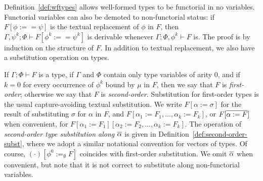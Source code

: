 \documentclass{lmcs}
\theoremstyle{plain}\newtheorem{satz}[thm]{Satz}
\begin{document}
Definition~\ref{def:wftypes} allows well-formed types to be functorial
in no variables. Functorial variables can also be demoted to
non-functorial status: if\,$F[\phi :== \psi]$ is the textual
replacement of $\phi$ in $F$, then $\Gamma, \psi^k; \Phi \vdash
F[\phi^k :== \psi^k]$ is derivable whenever $\Gamma; \Phi, \phi^k
\vdash F$ is. The proof is by induction on the structure of $F$. In
addition to textual replacement, we also have a substitution operation
on types.

If $\Gamma; \Phi \vdash F$ is a type, if $\Gamma$ and $\Phi$ contain
only type variables of arity $0$, and if $k=0$ for every occurrence of
$\phi^k$ bound by $\mu$ in $F$, then we say that $F$ is {\em
  first-order}; otherwise we say that $F$ is {\em
  second-order}. Substitution for first-order types is the usual
capture-avoiding textual substitution. We write $F[\alpha := \sigma]$
for the result of substituting $\sigma$ for $\alpha$ in $F$, and
$F[\alpha_1 := F_1,...,\alpha_k := F_k]$, or $F[\overline{\alpha := F}]$
when convenient, for $F[\alpha_1 := F_1][\alpha_2 := F_2,...,\alpha_k
  := F_k]$. The operation of {\em second-order type substitution along
  $\overline{\alpha}$} is given in Definition~\ref{def:second-order-subst},
where we adopt a similar notational convention for vectors of types.
Of course, $(\cdot)[\phi^0 :=_\emptyset F]$ coincides with first-order
substitution. We omit $\overline{\alpha}$ when convenient, but note that it
is not correct to substitute along non-functorial variables.
\end{document}
